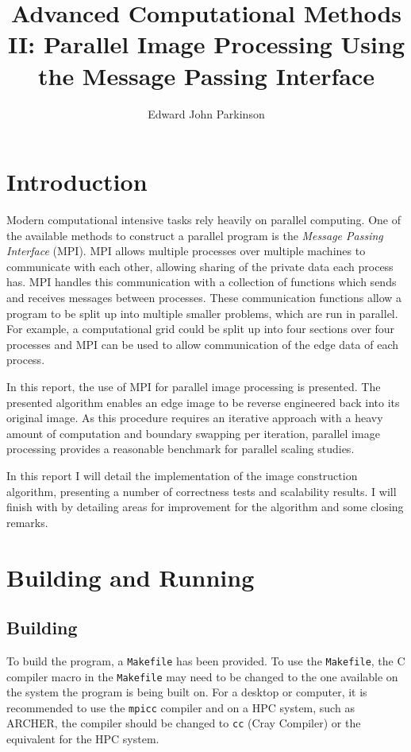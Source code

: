 \documentclass[11pt, a4paper]{article}
\begin{document}
	\title{Advanced Computational Methods II: Parallel Image Processing Using the Message Passing Interface}
	\author{Edward John Parkinson}
	\maketitle	
	
	\section{Introduction}
		Modern computational intensive tasks rely heavily on parallel computing. One of the available methods to construct a parallel program is the \textit{Message Passing Interface} (MPI). MPI allows multiple processes over multiple machines to communicate with each other, allowing sharing of the private data each process has. MPI handles this communication with a collection of functions which sends and receives messages between processes. These communication functions allow a program to be split up into multiple smaller problems, which are run in parallel. For example, a computational grid could be split up into four sections over four processes and MPI can be used to allow communication of the edge data of each process. 
		
		In this report, the use of MPI for parallel image processing is presented. The presented algorithm enables an edge image to be reverse engineered back into its original image. As this procedure requires an iterative approach with a heavy amount of computation and boundary swapping per iteration, parallel image processing provides a reasonable benchmark for parallel scaling studies.
		
		In this report I will detail the implementation of the image construction algorithm, presenting a number of correctness tests and scalability results. I will finish with by detailing areas for improvement for the algorithm and some closing remarks.
	
	\section{Building and Running}
		\subsection{Building}
			To build the program, a \texttt{Makefile} has been provided. To use the \texttt{Makefile}, the C compiler macro in the \texttt{Makefile} may need to be changed to the one available on the system the program is being built on. For a desktop or computer, it is recommended to use the \texttt{mpicc} compiler and on a HPC system, such as ARCHER, the compiler should be changed to \texttt{cc} (Cray Compiler) or the equivalent for the HPC system. 
		
\end{document}
